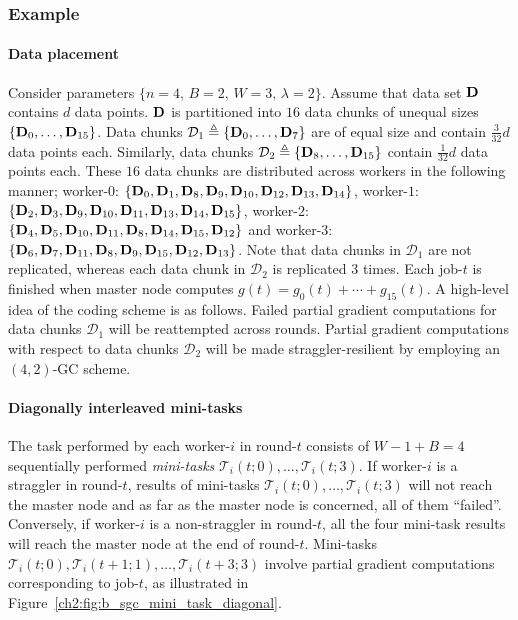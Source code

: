 \subsubsection{Example}\label{ch2:sec:M_SGC_example}

\paragraph{Data placement} Consider parameters $\{n=4,\, B=2,\, W=3,\, \lambda=2\}$. Assume that data set $\mathbf{D}$ contains $d$ data points. $\mathbf{D}$ is partitioned into $16$ data chunks of unequal sizes $\{\mathbf{D}_0,\ldots,\mathbf{D}_{15}\}$. Data chunks $\mathcal{D}_1\triangleq \{\mathbf{D}_0,\ldots,\mathbf{D}_{7}\}$ are of equal size and  contain $\frac{3}{32}d$ data points each. Similarly, data chunks $\mathcal{D}_2\triangleq\{\mathbf{D}_8,\ldots,\mathbf{D}_{15}\}$ contain $\frac{1}{32}d$ data points  each. These $16$ data chunks are distributed across workers in the following manner; worker-$0$: $\{\mathbf{D}_0,\mathbf{D}_1,\mathbf{D}_8,\mathbf{D}_9,\mathbf{D}_{10},\mathbf{D}_{12},\mathbf{D}_{13},\mathbf{D}_{14}\}$,  worker-$1$: $\{\mathbf{D}_2,\mathbf{D}_3,\mathbf{D}_9,\mathbf{D}_{10},\mathbf{D}_{11},\mathbf{D}_{13},\mathbf{D}_{14},\mathbf{D}_{15}\}$, worker-$2$: $\{\mathbf{D}_4,\mathbf{D}_5,\mathbf{D}_{10},\mathbf{D}_{11},\mathbf{D}_{8},\mathbf{D}_{14},\mathbf{D}_{15},\mathbf{D}_{12}\}$ and worker-$3$: $\{\mathbf{D}_6,\mathbf{D}_7,\mathbf{D}_{11},\mathbf{D}_{8},\mathbf{D}_{9},\mathbf{D}_{15},\mathbf{D}_{12},\mathbf{D}_{13}\}$. Note that data chunks in $\mathcal{D}_1$ are not replicated, whereas each data chunk in $\mathcal{D}_2$ is replicated $3$ times. Each job-$t$ is finished when master node computes $g(t)=g_0(t)+\cdots+g_{15}(t)$. A high-level idea of the coding scheme is as follows. Failed partial gradient computations for data chunks $\mathcal{D}_1$ will be reattempted across rounds. Partial gradient computations with respect to data chunks $\mathcal{D}_2$ will be made straggler-resilient by employing an $(4,2)$-GC scheme.

\paragraph{Diagonally interleaved mini-tasks} The task performed by each worker-$i$   in round-$t$ consists of $W-1+B=4$ sequentially performed \textit{mini-tasks} $\mathcal{T}_i(t;0),\ldots,\mathcal{T}_i(t;3)$. If worker-$i$ is a straggler in round-$t$,  results of mini-tasks $\mathcal{T}_i(t;0),\ldots,\mathcal{T}_i(t;3)$ will not reach the master node and as far as the master node is concerned, all of them ``failed''. Conversely, if worker-$i$ is a non-straggler in round-$t$, all the four mini-task results will reach the master node at the end of round-$t$. Mini-tasks $\mathcal{T}_i(t;0), \mathcal{T}_i(t+1;1), \ldots, \mathcal{T}_i(t+3;3)$ involve partial gradient computations corresponding to job-$t$, as illustrated in Figure~\ref{ch2:fig:b_sgc_mini_task_diagonal}.

